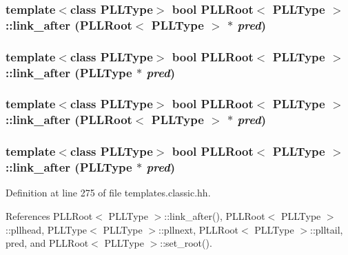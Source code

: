 \subsubsection{\setlength{\rightskip}{0pt plus 5cm}template$<$class PLLType$>$ bool PLLRoot$<$ {\bf PLLType} $>$::link\_\-after (PLLRoot$<$ {\bf PLLType} $>$ $\ast$ {\em pred})\hspace{0.3cm}{\tt  [inline]}}\label{classPLLRoot_a44}


\subsubsection{\setlength{\rightskip}{0pt plus 5cm}template$<$class PLLType$>$ bool PLLRoot$<$ {\bf PLLType} $>$::link\_\-after ({\bf PLLType} $\ast$ {\em pred})\hspace{0.3cm}{\tt  [inline]}}\label{classPLLRoot_a28}


\subsubsection{\setlength{\rightskip}{0pt plus 5cm}template$<$class PLLType$>$ bool PLLRoot$<$ {\bf PLLType} $>$::link\_\-after (PLLRoot$<$ {\bf PLLType} $>$ $\ast$ {\em pred})\hspace{0.3cm}{\tt  [inline]}}\label{classPLLRoot_a27}


\subsubsection{\setlength{\rightskip}{0pt plus 5cm}template$<$class PLLType$>$ bool PLLRoot$<$ {\bf PLLType} $>$::link\_\-after ({\bf PLLType} $\ast$ {\em pred})\hspace{0.3cm}{\tt  [inline]}}\label{classPLLRoot_a11}




Definition at line 275 of file templates.classic.hh.

References PLLRoot$<$ PLLType $>$::link\_\-after(), PLLRoot$<$ PLLType $>$::pllhead, PLLType$<$ PLLType $>$::pllnext, PLLRoot$<$ PLLType $>$::plltail, pred, and PLLRoot$<$ PLLType $>$::set\_\-root().



